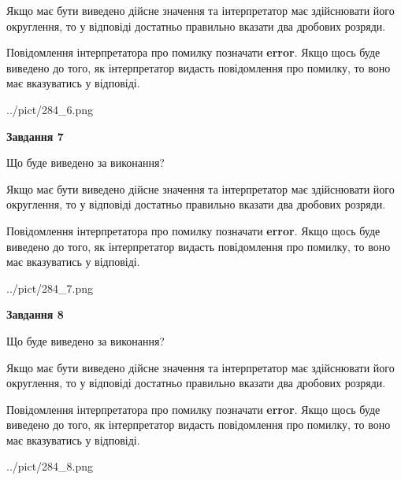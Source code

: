 \documentclass[12pt, ukrainian]{article}
\begin{document}
{\begin {Large}
Якщо має бути виведено дійсне значення та інтерпретатор має здійснювати його округлення, 
то у відповіді достатньо правильно вказати два дробових розряди.

Повідомлення інтерпретатора про помилку позначати \textbf{error}.
Якщо щось буде виведено до того, як інтерпретатор видасть повідомлення про помилку, 
то воно має вказуватись у відповіді. \par

\begin{center}
	{../pict/284_6.png}
\end{center}
\newpage

{\begin {center}\textbf{Завдання 7}\end {center}}\par
Що буде виведено за виконання? \par

Якщо має бути виведено дійсне значення та інтерпретатор має здійснювати його округлення, 
то у відповіді достатньо правильно вказати два дробових розряди.

Повідомлення інтерпретатора про помилку позначати \textbf{error}.
Якщо щось буде виведено до того, як інтерпретатор видасть повідомлення про помилку, 
то воно має вказуватись у відповіді. \par

\begin{center}
	{../pict/284_7.png}
\end{center}
\newpage

{\begin {center}\textbf{Завдання 8}\end {center}}\par
Що буде виведено за виконання? \par

Якщо має бути виведено дійсне значення та інтерпретатор має здійснювати його округлення, 
то у відповіді достатньо правильно вказати два дробових розряди.

Повідомлення інтерпретатора про помилку позначати \textbf{error}.
Якщо щось буде виведено до того, як інтерпретатор видасть повідомлення про помилку, 
то воно має вказуватись у відповіді. \par

\begin{center}
	{../pict/284_8.png}
\end{center}
\newpage


\end{Large}}
\end{document}
